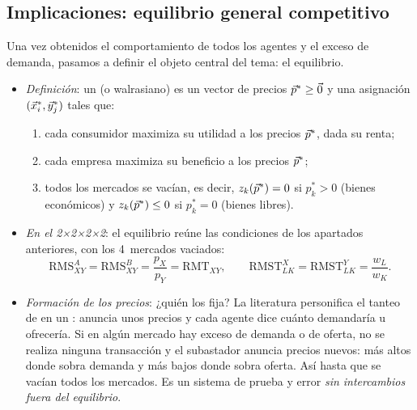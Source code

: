 \documentclass[11pt]{article}
\begin{document}
\subsection{Implicaciones: equilibrio general competitivo}\label{sec:implicaciones-equilibrio-general}

Una vez obtenidos el comportamiento de todos los agentes y el exceso de demanda, pasamos a definir el objeto central del tema: el equilibrio.

\begin{itemize}
\item \emph{Definición}: un  (o walrasiano) es un vector de precios $\vec{p}^*\geq\vec{0}$ y una asignación $(\vec{x}^*_i,\vec{y}^*_j)$ tales que:
  \begin{enumerate}
  \item cada consumidor maximiza su utilidad a los precios $\vec{p}^*$, dada su renta;
  \item cada empresa maximiza su beneficio a los precios $\vec{p}^*$;
  \item todos los mercados se vacían,
    es decir, $z_k(\vec{p}^*)=0$ si $p^*_k>0$ (bienes económicos) y $z_k(\vec{p}^*)\leq 0$ si $p^*_k=0$ (bienes libres).
  \end{enumerate}
\item \emph{En el 2×2×2×2}: el equilibrio reúne las condiciones de los apartados anteriores, con los 4~mercados vaciados:
  \begin{equation}
  \mathrm{RMS}^A_{XY}=\mathrm{RMS}^B_{XY}=\frac{p_X}{p_Y}=\mathrm{RMT}_{XY},\qquad \mathrm{RMST}^X_{LK}=\mathrm{RMST}^Y_{LK}=\frac{w_L}{w_K}. \label{eq:egc-2x2}
  \end{equation}
\item \emph{Formación de los precios}: ¿quién los fija? La literatura personifica el tanteo de  en un : anuncia unos precios y cada agente dice cuánto demandaría u ofrecería. Si en algún mercado hay exceso de demanda o de oferta, no se realiza ninguna transacción y el subastador anuncia precios nuevos: más altos donde sobra demanda y más bajos donde sobra oferta. Así hasta que se vacían todos los mercados. Es un sistema de prueba y error \emph{sin intercambios fuera del equilibrio}.
\end{itemize}
\end{document}
